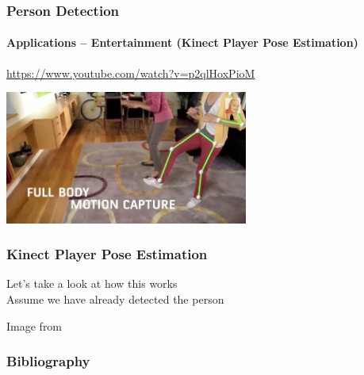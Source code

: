 \documentclass[xetex,professionalfont]{beamer}
\begin{document}
\begin{frame}
\frametitle{Person Detection}
\framesubtitle{Applications -- Entertainment (Kinect Player Pose Estimation)}

\begin{center}
    \url{https://www.youtube.com/watch?v=p2qlHoxPioM}
\end{center}

\begin{center}
    \includegraphics[width=8cm]{figures/kinect-promo.jpg}
\end{center}

\end{frame}


\begin{frame}
\frametitle{Kinect Player Pose Estimation}

Let's take a look at how this works\\\medskip
Assume we have already detected the person

\bigskip
\begin{center}
    {\centering Image from \cite{shotton2011}}
\end{center}

\end{frame}


\begin{frame}[allowframebreaks=0.9]
\frametitle{Bibliography}

\printbibliography

\end{frame}
\end{document}
